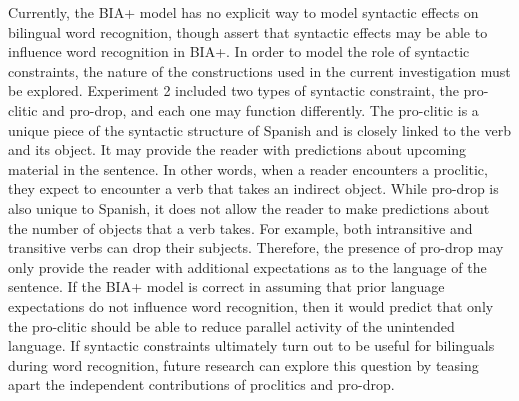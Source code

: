 
Currently, the BIA+ model has no explicit way to model syntactic effects on bilingual word recognition, though \textcite{Dijkstra2002} assert that syntactic effects may be able to influence word recognition in BIA+. In order to model the role of syntactic constraints, the nature of the constructions used in the current investigation must be explored. Experiment 2 included two types of syntactic constraint, the pro-clitic and pro-drop, and each one may function differently. The pro-clitic is a unique piece of the syntactic structure of Spanish and is  closely linked to the verb and its object. It may provide the reader with predictions about upcoming material in the sentence. In other words, when a reader encounters a proclitic, they expect to encounter a verb that takes an indirect object. While pro-drop is also unique to Spanish, it does not allow the reader to make predictions about the number of objects that a verb takes. For example, both intransitive and transitive verbs can  drop their subjects. Therefore, the presence of pro-drop may only provide the reader with additional expectations as to the language of the sentence. If the BIA+ model is correct in assuming that prior language expectations do not influence word recognition, then it would predict that only the pro-clitic should be able to reduce parallel activity of the unintended language.  If syntactic constraints ultimately turn out to be useful for bilinguals during word recognition, future research can explore this question by teasing apart the independent contributions of proclitics and pro-drop. 


